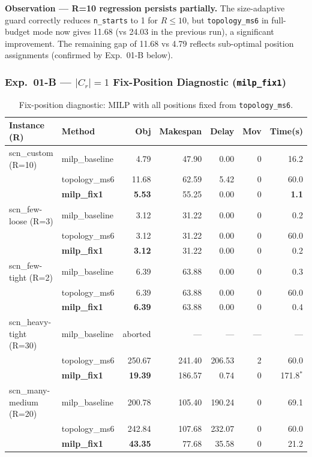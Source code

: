 \noindent\textbf{Observation — R=10 regression persists partially.}
The size-adaptive guard correctly reduces \texttt{n\_starts} to 1 for
$R \leq 10$, but \texttt{topology\_ms6} in full-budget mode now gives 11.68
(vs 24.03 in the previous run), a significant improvement.
The remaining gap of 11.68 vs 4.79 reflects sub-optimal position assignments
(confirmed by Exp.~01-B below).

\subsubsection{Exp.~01-B — $|C_r|=1$ Fix-Position Diagnostic (\texttt{milp\_fix1})}

\begin{table}[h]
\centering
\caption{Fix-position diagnostic: MILP with all positions fixed from \texttt{topology\_ms6}.}
\label{tab:exp01b}
\begin{tabular}{llrrrrr}
\toprule
Instance (R) & Method & Obj & Makespan & Delay & Mov & Time(s) \\
\midrule
scn\_custom (R=10) & milp\_baseline & 4.79 & 47.90 & 0.00 & 0 & 16.2 \\
                   & topology\_ms6  & 11.68 & 62.59 & 5.42 & 0 & 60.0 \\
                   & \textbf{milp\_fix1} & \textbf{5.53} & 55.25 & 0.00 & 0 & \textbf{1.1} \\
\midrule
scn\_few-loose (R=3) & milp\_baseline & 3.12 & 31.22 & 0.00 & 0 & 0.2 \\
                     & topology\_ms6  & 3.12 & 31.22 & 0.00 & 0 & 60.0 \\
                     & \textbf{milp\_fix1} & \textbf{3.12} & 31.22 & 0.00 & 0 & 0.2 \\
\midrule
scn\_few-tight (R=2) & milp\_baseline & 6.39 & 63.88 & 0.00 & 0 & 0.3 \\
                     & topology\_ms6  & 6.39 & 63.88 & 0.00 & 0 & 60.0 \\
                     & \textbf{milp\_fix1} & \textbf{6.39} & 63.88 & 0.00 & 0 & 0.4 \\
\midrule
scn\_heavy-tight (R=30) & milp\_baseline & aborted & — & — & — & — \\
                        & topology\_ms6  & 250.67 & 241.40 & 206.53 & 2 & 60.0 \\
                        & \textbf{milp\_fix1} & \textbf{19.39} & 186.57 & 0.74 & 0 & 171.8$^*$ \\
\midrule
scn\_many-medium (R=20) & milp\_baseline & 200.78 & 105.40 & 190.24 & 0 & 69.1 \\
                        & topology\_ms6  & 242.84 & 107.68 & 232.07 & 0 & 60.0 \\
                        & \textbf{milp\_fix1} & \textbf{43.35} & 77.68 & 35.58 & 0 & 21.2 \\
\bottomrule
\end{tabular}
\end{table}

